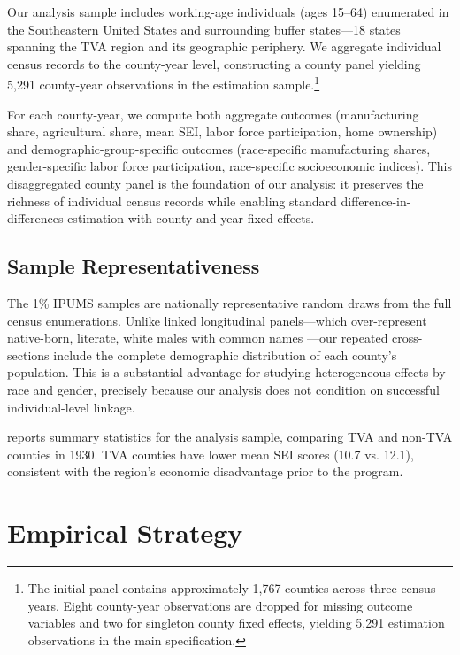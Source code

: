 \documentclass[12pt]{article}
\begin{document}
Our analysis sample includes working-age individuals (ages 15--64) enumerated in the Southeastern United States and surrounding buffer states---18 states spanning the TVA region and its geographic periphery. We aggregate individual census records to the county-year level, constructing a county panel yielding 5,291 county-year observations in the estimation sample.\footnote{The initial panel contains approximately 1,767 counties across three census years. Eight county-year observations are dropped for missing outcome variables and two for singleton county fixed effects, yielding 5,291 estimation observations in the main specification.}

For each county-year, we compute both aggregate outcomes (manufacturing share, agricultural share, mean SEI, labor force participation, home ownership) and demographic-group-specific outcomes (race-specific manufacturing shares, gender-specific labor force participation, race-specific socioeconomic indices). This disaggregated county panel is the foundation of our analysis: it preserves the richness of individual census records while enabling standard difference-in-differences estimation with county and year fixed effects.

\subsection{Sample Representativeness}

The 1\% IPUMS samples are nationally representative random draws from the full census enumerations. Unlike linked longitudinal panels---which over-represent native-born, literate, white males with common names \citep{abramitzky2021, bailey2020}---our repeated cross-sections include the complete demographic distribution of each county's population. This is a substantial advantage for studying heterogeneous effects by race and gender, precisely because our analysis does not condition on successful individual-level linkage.

 reports summary statistics for the analysis sample, comparing TVA and non-TVA counties in 1930. TVA counties have lower mean SEI scores (10.7 vs. 12.1), consistent with the region's economic disadvantage prior to the program.


\section{Empirical Strategy}\label{sec:strategy}
\end{document}
